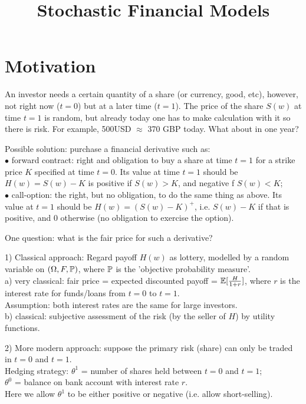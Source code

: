 \documentclass[a4paper]{article}
\begin{document}
\title{Stochastic Financial Models}

\maketitle

\newpage

\tableofcontents

\newpage

\section{Motivation}
An investor needs a certain quantity of a share (or currency, good, etc), however, not right now ($t=0$) but at a later time ($t=1$). The price of the share $S(w)$ at time $t=1$ is random, but already today one has to make calculation with it so there is risk. For example, 500USD $\approx$ 370 GBP today. What about in one year?

Possible solution: purchase a financial derivative such as:\\
$\bullet$ forward contract: right and obligation to buy a share at time $t=1$ for a strike price $K$ specified at time $t=0$. Its value at time $t=1$ should be $H(w) = S(w) - K$ is positive if $S(w) > K$, and negative f $S(w) < K$;\\
$\bullet$ call-option: the right, but no obligation, to do the same thing as above. Its value at $t=1$ should be $H(w) = (S(w)-K)^+$, i.e. $S(w)-K$ if that is positive, and 0 otherwise (no obligation to exercise the option).

One question: what is the fair price for such a derivative?

1) Classical approach: Regard payoff $H(w)$ as lottery, modelled by a random variable on $(\Omega,F,\P)$, where $\P$ is the 'objective probability measure'.\\
a) very classical: fair price = expected discounted payoff = $\E[\frac{H}{1+r}]$, where $r$ is the interest rate for funds/loans from $t=0$ to $t=1$.\\
Assumption: both interest rates are the same for large investors.\\
b) classical: subjective assessment of the risk (by the seller of $H$) by utility functions.

2) More modern approach: suppose the primary risk (share) can only be traded in $t=0$ and $t=1$.\\
Hedging strategy: $\theta^1$ = number of shares held between $t=0$ and $t=1$;\\
$\theta^0$ = balance on bank account with interest rate $r$.\\
Here we allow $\theta^1$ to be either positive or negative (i.e. allow short-selling).
\end{document}
